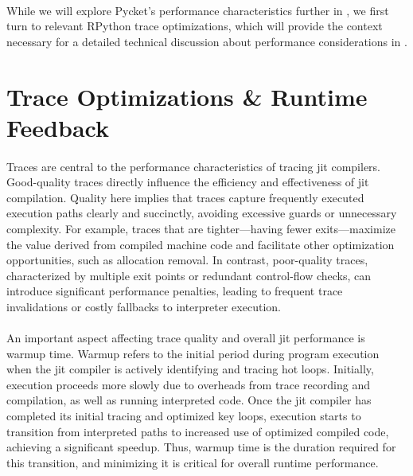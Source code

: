         \paragraph{}%
            While we will explore Pycket’s performance characteristics further in , we first turn to relevant RPython trace optimizations, which will provide the context necessary for a detailed technical discussion about performance considerations in .

    \section[\texorpdfstring{Trace Optimizations \& Runtime Feedback}{Trace Optimizations}]{Trace Optimizations \& Runtime Feedback}

        \paragraph{}%
            Traces are central to the performance characteristics of tracing \gls{jit} compilers. Good-quality traces directly influence the efficiency and effectiveness of \gls{jit} compilation. Quality here implies that traces capture frequently executed execution paths clearly and succinctly, avoiding excessive guards or unnecessary complexity. For example, traces that are tighter—having fewer exits—maximize the value derived from compiled machine code and facilitate other optimization opportunities, such as allocation removal. In contrast, poor-quality traces, characterized by multiple exit points or redundant control-flow checks, can introduce significant performance penalties, leading to frequent trace invalidations or costly fallbacks to interpreter execution.

        \paragraph{}%
            An important aspect affecting trace quality and overall \gls{jit} performance is warmup time. Warmup refers to the initial period during program execution when the \gls{jit} compiler is actively identifying and tracing hot loops. Initially, execution proceeds more slowly due to overheads from trace recording and compilation, as well as running interpreted code. Once the \gls{jit} compiler has completed its initial tracing and optimized key loops, execution starts to transition from interpreted paths to increased use of optimized compiled code, achieving a significant speedup. Thus, warmup time is the duration required for this transition, and minimizing it is critical for overall runtime performance.

